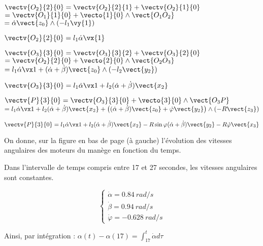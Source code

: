 \ifprof
\begin{corrige}
$ \vectv{O_2}{2}{0} =\vectv{O_2}{2}{1}+\vectv{O_2}{1}{0}$ 
$=\vectv{O_1}{1}{0}+\vecto{1}{0}\wedge\vect{O_1 O_2}$
$= \dot\alpha\vect{z_0} \wedge (-l_1 \vy{1})$

$\vectv{O_2}{2}{0}= l_1\dot\alpha\vx{1}$

$\vectv{O_3}{3}{0} =\vectv{O_3}{3}{2}+\vectv{O_3}{2}{0}$
$=\vectv{O_2}{2}{0}+\vecto{2}{0}\wedge \vect{O_2 O_3}$
$=l_1\dot\alpha\vx1+(\dot\alpha+\dot\beta)\vect{z_0}\wedge (-l_2 \vect{y_2})$

$\vectv{O_3}{3}{0}=l_1\dot\alpha\vx1+l_2(\dot\alpha+\dot\beta)\vect{x_2}$

$\vectv{P}{3}{0}=\vectv{O_3}{3}{0}+\vecto{3}{0}\wedge\vect{O_3 P}$	$=l_1\dot\alpha\vx1+l_2(\dot\alpha+\dot\beta)\vect{x_2}+ \left((\dot\alpha+\dot\beta)\vect{z_0}+\dot\varphi\vect{y_2}\right)\wedge(-R\vect{z_3})$

$\vectv{P}{3}{0}=l_1\dot\alpha\vx1+l_2(\dot\alpha+\dot\beta)\vect{x_2}-R\sin\varphi(\dot\alpha+\dot\beta)\vect{y_2}-R\dot\varphi\vect{x_3}$
\end{corrige}\else\fi


On donne, sur la figure en bas de page (à gauche) l'évolution des vitesses angulaires des moteurs du manège en fonction du temps.

\ifprof
\begin{corrige}

Dans l'intervalle de temps compris entre 17 et 27 secondes, les vitesses angulaires sont constantes.

$$
\left\{
\begin{array}{l}
{\dot\alpha}{=\SI{0,84}{rad/s}}\\
{\dot\beta}{=\SI{0,94}{rad/s}}\\
{\dot\varphi}{=-\SI{0,628}{rad/s}}
\end{array}
\right.
$$

Ainsi, par intégration :
$\alpha (t)-\alpha(17)=\int_{17}^t \dot\alpha d\tau $

\end{corrige}\else\fi

